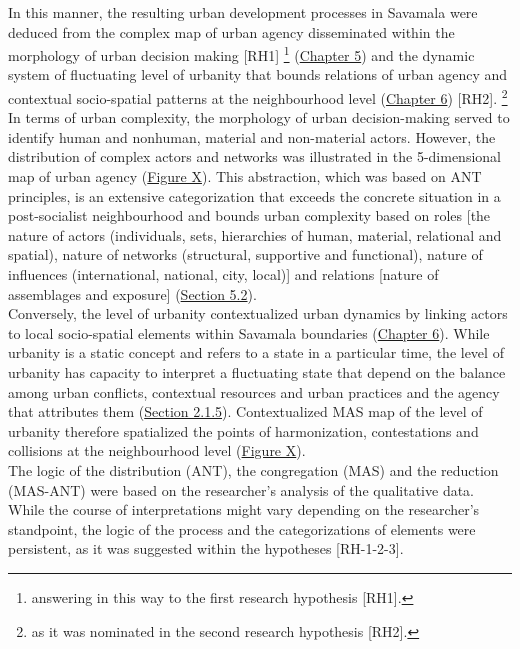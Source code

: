 \documentclass[11pt]{report}
\begin{document}
{{{In this manner, the resulting urban development processes in Savamala were deduced from the complex map of urban agency disseminated within the morphology of urban decision making [RH1]
\footnote{answering in this way to the first research hypothesis [RH1].}
(\href{Chapter 5}{Chapter 5})
and the dynamic system of fluctuating level of urbanity that bounds relations of urban agency and contextual socio-spatial patterns at the neighbourhood level
(\href{Chapter 6}{Chapter 6}) [RH2].
\footnote{as it was nominated in the second research hypothesis [RH2].}
\\

In terms of urban complexity, the morphology of urban decision-making served to identify human and nonhuman, material and non-material actors. However, the distribution of complex actors and networks was illustrated in the 5-dimensional map of urban agency (\href{Figure ANT diagram}{Figure X}).
This abstraction, which was based on ANT principles, is an extensive categorization that exceeds the concrete situation in a post-socialist neighbourhood and bounds urban complexity based on roles [the nature of actors (individuals, sets, hierarchies of human, material, relational and spatial), nature of networks (structural, supportive and functional), nature of influences (international, national, city, local)] and relations [nature of assemblages and exposure] (\href{Section 5.2}{Section 5.2}).
\\

Conversely, the level of urbanity contextualized urban dynamics by linking actors to local socio-spatial elements within Savamala boundaries  (\href{Chapter 6}{Chapter 6}). 
While urbanity is a static concept and refers to a state in a particular time, the level of urbanity has capacity to interpret a fluctuating state that depend on the balance among urban conflicts, contextual resources and urban practices and the agency that attributes them (\href{Section 2.1.5}{Section 2.1.5}).
Contextualized MAS map of the level of urbanity therefore spatialized the points of harmonization, contestations and collisions at the neighbourhood level (\href{Figure MAS diagram}{Figure X}).
\\

The logic of the distribution (ANT), the congregation (MAS) and the reduction (MAS-ANT) were based on the researcher's analysis of the qualitative data. While the course of interpretations might vary depending on the researcher's standpoint, the logic of the process and the categorizations of elements were persistent, as it was suggested within the hypotheses [RH-1-2-3].

}}}
\end{document}
